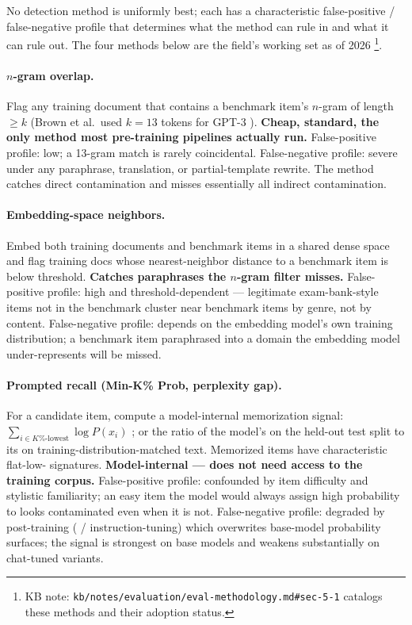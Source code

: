 No detection method is uniformly best; each has a characteristic
false-positive / false-negative profile that determines what the
method can rule in and what it can rule out. The four methods below
are the field's working set as of 2026%
\footnote{KB note: \nolinkurl{kb/notes/evaluation/eval-methodology.md#sec-5-1} catalogs these methods and their adoption status.}.

\paragraph{$n$-gram overlap.} Flag any training document that contains
a benchmark item's $n$-gram of length $\geq k$ (Brown et al.\ used
$k = 13$ tokens for GPT-3 ).
\textbf{Cheap, standard, the only method most pre-training pipelines
actually run.} False-positive profile: low; a 13-gram match is rarely
coincidental. False-negative profile: severe under any paraphrase,
translation, or partial-template rewrite. The method catches direct
contamination and misses essentially all indirect contamination.

\paragraph{Embedding-space neighbors.} Embed both training documents
and benchmark items in a shared dense space and flag training docs
whose nearest-neighbor distance to a benchmark item is below threshold.
\textbf{Catches paraphrases the $n$-gram filter misses.} False-positive
profile: high and threshold-dependent --- legitimate exam-bank-style
items not in the benchmark cluster near benchmark items by genre, not
by content. False-negative profile: depends on the embedding model's
own training distribution; a benchmark item paraphrased into a domain
the embedding model under-represents will be missed.

\paragraph{Prompted recall (Min-K\% Prob, perplexity gap).} For a
candidate item, compute a model-internal memorization signal:
$\sum_{i \in K\%\text{-lowest}} \log P(x_i)$ ;
or the ratio of the model's  on the held-out test split
to its  on training-distribution-matched text. Memorized
items have characteristic flat-low- signatures.
\textbf{Model-internal --- does not need access to the training corpus.}
False-positive profile: confounded by item difficulty and stylistic
familiarity; an easy item the model would always assign high
probability to looks contaminated even when it is not. False-negative
profile: degraded by post-training ( / instruction-tuning) which
overwrites base-model probability surfaces; the signal is strongest
on base models and weakens substantially on chat-tuned variants.

